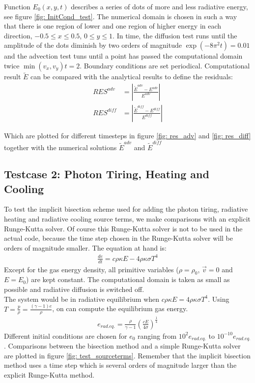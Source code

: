 Function $E_0(x,y,t)$ describes a series of dots of more and less radiative energy, see figure \ref{fig: InitCond_test}. The numerical domain is chosen in such a way that there is one region of lower and one region of higher energy in each direction, $-0.5 \leq x \leq 0.5$, $0 \leq y \leq 1$. In time, the diffusion test runs until the amplitude of the dots diminish by two orders of magnitude $\exp(-8 \pi^2 t)  = 0.01$ and the advection test tuns until a point has passed the computational domain twice $ \min(v_x, v_y) t = 2 $. Boundary conditions are set periodical. Computational result $\tilde{E}$ can be compared with the analytical results to define the residuals:
\begin{align}
RES^{adv} &= \left|\frac{\tilde{E}^{adv} - E^{adv}}{E^{adv}}\right| \\
RES^{diff} &= \left|\frac{\tilde{E}^{diff} - E^{diff}}{E^{diff}}\right| 
\end{align}

Which are plotted for different timesteps in figure \ref{fig: res_adv} and \ref{fig: res_diff} together with the numerical solutions $\tilde{E}^{adv}$ and $\tilde{E}^{diff}$

\subsection{Testcase 2: Photon Tiring, Heating and Cooling}
To test the implicit bisection scheme used for adding the photon tiring, radiative heating and radiative cooling source terms, we make comparisons with an explicit Runge-Kutta solver. Of course this Runge-Kutta solver is not to be used in the actual code, because the time step chosen in the Runge-Kutta solver will be orders of magnitude smaller. The equation at hand is:
\begin{align}
\frac{d e}{dt} = c \rho \kappa E - 4 \rho \kappa \sigma T^4
\end{align}
Except for the gas energy density, all primitive variables ($\rho = \rho_0$, $\vec{v} = 0$ and $E = E_0$) are kept constant. The computational domain is taken as small as possible and radiative diffusion is switched off. \\

The system would be in radiative equilibrium when $c \rho \kappa E = 4 \rho \kappa \sigma T^4$. Using $T =  \frac{p}{\rho}= \frac{(\gamma - 1)e}{\rho}$, on can compute the equilibrium gas energy.
\begin{align}
e_{rad. eq.} = \frac{\rho}{\gamma - 1} \left( \frac{c E}{4 \sigma} \right)^\frac{1}{4}
\end{align}
Different initial conditions are chosen for $e_0$ ranging from $10^2 e_{rad. eq.}$ to $10^{-10} e_{rad. eq.}$. Comparisons between the bisection method and a simple Runge-Kutta solver are plotted in figure \ref{fig: test_sourceterms}. Remember that the implicit bisection method uses a time step which is several orders of magnitude larger than the explicit Runge-Kutta method.

